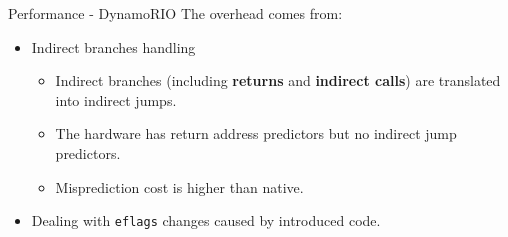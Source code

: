 \documentclass[aspectratio=169,xcolor=x11names]{beamer}
\begin{document}
	\begin{frame}{Performance - DynamoRIO}
		The overhead comes from:
		\begin{itemize}
			\item Indirect branches handling
			\begin{itemize}
				\item Indirect branches (including \textbf{returns} and \textbf{indirect calls}) are translated into indirect jumps.
				\item The hardware has return address predictors but no indirect jump predictors.
				\item Misprediction cost is higher than native.
			\end{itemize}
			\item Dealing with \texttt{eflags} changes caused by introduced code.
		\end{itemize}
	\end{frame}
\end{document}
